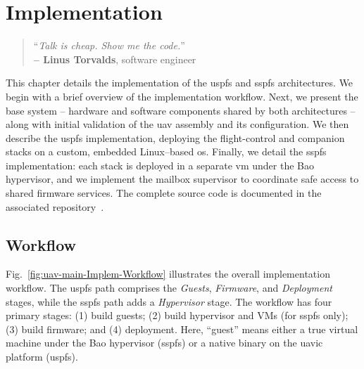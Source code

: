 %
\chapter{Implementation}
\label{cha:implementation}

\begin{quote}
\begin{flushright}
``\emph{Talk is cheap. Show me the code.}'' \\
\textbf{-- Linus Torvalds}, software engineer
\end{flushright}
\end{quote}

This chapter details the implementation of the \gls{uspfs} and \gls{sspfs}
architectures. We begin with a brief overview of the implementation workflow.
Next, we present the base system -- hardware and software components shared by both
architectures -- along with initial validation of the \gls{uav} assembly and its
configuration. We then describe the \gls{uspfs} implementation, deploying the
flight-control and companion stacks on a custom, embedded Linux–based \gls{os}.
Finally, we detail the \gls{sspfs} implementation: each stack is deployed in a
separate \gls{vm} under the Bao hypervisor, and we implement the mailbox
supervisor to coordinate safe access to shared firmware services. The complete
source code is documented in the associated repository~\cite{thesis-sw-github}.

\section{Workflow}
\label{sec:workflow}
Fig.~\ref{fig:uav-main-Implem-Workflow} illustrates the overall implementation
workflow. The \gls{uspfs} path comprises the \emph{Guests}, \emph{Firmware}, and
\emph{Deployment} stages, while the \gls{sspfs} path adds a \emph{Hypervisor}
stage. The workflow has four primary stages:
(1) build guests;
(2) build hypervisor and VMs (for \gls{sspfs} only);
(3) build firmware; and
(4) deployment.
Here, ``guest'' means either a true virtual machine under the Bao hypervisor
(\gls{sspfs}) or a native binary on the \gls{uavic} platform (\gls{uspfs}).

